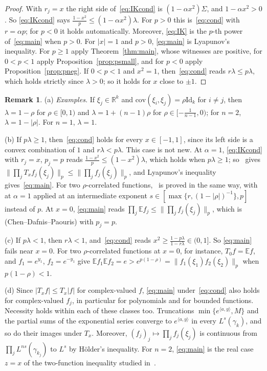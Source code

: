 \documentclass[11pt]{amsart}
\theoremstyle{definition}
\newtheorem{remark}[theorem]{Remark}
\newcommand{\E}{\mathbb{E}}
\newcommand{\R}{\mathbb{R}}
\newcommand{\Id}{\mathrm{Id}}
\begin{document}
\begin{proof}
With $r_j=x$ the right side of~\eqref{eq:IKcond} is $(1-\alpha x^2)\Sigma$, and $1-\alpha x^2>0$. So
\eqref{eq:IKcond} says $\frac{1-x^2}p\le(1-\alpha x^2)\lambda$. For $p>0$ this is~\eqref{eq:cond} with $r=\alpha p$;
for $p<0$ it holds automatically. Moreover,
\eqref{eq:IK} is the $p$-th power of~\eqref{eq:main} when $p>0$. For $|x|=1$ and $p>0$, \eqref{eq:main} is
Lyapunov's inequality. For $p\ge1$ apply Theorem~\ref{thm:main}, whose witnesses are positive, for $0<p<1$ apply
Proposition~\ref{prop:psmall}, and for $p<0$ apply Proposition~\ref{prop:pneg}. If $0<p<1$ and $x^2=1$,
then~\eqref{eq:cond} reads $r\lambda\le p\lambda$, which holds strictly since $\lambda>0$; so it holds for $x$ close
to $\pm1$.
\end{proof}

\begin{remark}\label{rem:cases}
(a) \emph{Examples.} If $\xi_j\in\R^k$ and $\mathrm{cov}(\xi_i,\xi_j)=\rho\Id_k$ for $i\ne j$, then $\lambda=1-\rho$ for
$\rho\in[0,1)$ and $\lambda=1+(n-1)\rho$ for $\rho\in[-\frac1{n-1},0)$; for $n=2$, $\lambda=1-|\rho|$. For $n=1$,
$\lambda=1$.

(b) If $p\lambda\ge1$, then~\eqref{eq:cond} holds for every $x\in[-1,1]$, since its left side is a convex combination
of $1$ and $r\lambda<p\lambda$. This case is not new. At $\alpha=1$, \eqref{eq:IKcond} with $r_j=x$, $p_j=p$ reads
$\frac{1-x^2}p\le(1-x^2)\lambda$, which holds when $p\lambda\ge1$; so~\cite[Thm.~9(i)]{IK25} gives
$\|\prod_jT_xf_j(\xi_j)\|_p\le\|\prod_jf_j(\xi_j)\|_p$, and Lyapunov's inequality gives~\eqref{eq:main}. For two
$\rho$-correlated functions,~\cite[Prop.~1.4(a)]{MF} is proved in the same way, with~\cite[Thm.~1]{IK25} at $\alpha=1$ applied at an intermediate exponent $s\in[\max\{r,(1-|\rho|)^{-1}\},p]$ instead of $p$. At $x=0$, \eqref{eq:main} reads
$\prod_j\E f_j\le\|\prod_jf_j(\xi_j)\|_p$, which is~\cite[Theorem~B]{IK25} (Chen--Dafnis--Paouris) with $p_j=p$.

(c) If $p\lambda<1$, then $r\lambda<1$, and~\eqref{eq:cond} reads $x^2\ge\frac{1-p\lambda}{1-r\lambda}\in(0,1]$. So
\eqref{eq:main} fails near $x=0$. For two $\rho$-correlated functions at $x=0$, for instance, $T_0f=\E f$, and
$f_1=e^{y_1}$, $f_2=e^{-y_1}$ give $\E f_1\E f_2=e>e^{p(1-\rho)}=\|f_1(\xi_1)f_2(\xi_2)\|_p$ when $p(1-\rho)<1$.

(d) Since $|T_xf|\le T_x|f|$ for complex-valued $f$, \eqref{eq:main} under~\eqref{eq:cond} also holds for
complex-valued $f_j$, in particular for polynomials and for bounded functions. Necessity holds within each of these
classes too. Truncations $\min\{e^{\langle a,y\rangle},M\}$ and the partial sums of the exponential series converge
to $e^{\langle a,y\rangle}$ in every $L^s(\gamma_k)$, and so do their images under $T_x$. Moreover,
$(f_j)_j\mapsto\prod_jf_j(\xi_j)$ is continuous from $\prod_jL^{ns}(\gamma_{k_j})$ to $L^s$ by H\"older's inequality.
For $n=2$, \eqref{eq:main} is the real case $z=x$ of the two-function inequality studied in~\cite{MF,JB}.


\end{remark}
\end{document}

